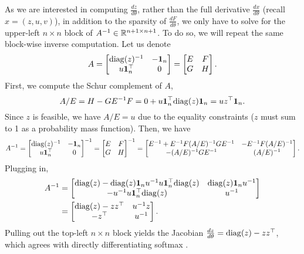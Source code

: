 \documentclass[11pt]{article}
\begin{document}
As we are interested in computing $\frac{dz}{d\theta}$,
rather than the full derivative $\frac{dx}{d\theta}$ (recall $x = (z,u,v)$),
in addition to the sparsity of $\frac{dF}{d\theta}$, 
we only have to solve for the upper-left $n\times n$ block of $A^{-1}\in\mathbb{R}^{n+1\times n+1}$.
To do so, we will repeat the same block-wise inverse computation.
Let us denote
$$A
= \begin{bmatrix} \mathrm{diag}(z)^{-1} & -\mathbf{1}_n \\ u\mathbf{1}_n^\top & 0 \end{bmatrix}
= \begin{bmatrix}E & F \\ G & H\end{bmatrix}.
$$
First, we compute the Schur complement of $A$,
\begin{equation}
A/E = H - GE^{-1}F = 0 + u\mathbf{1}_n^\top\mathrm{diag}(z)\mathbf{1}_n = uz^\top\mathbf{1}_n.
\end{equation}
Since $z$ is feasible, we have $A/E = u$ due to the equality constraints
($z$ must sum to 1 as a probability mass function).
Then, we have
\begin{equation}
A^{-1} = \begin{bmatrix}
\mathrm{diag}(z)^{-1} & -\mathbf{1}_n\\
u\mathbf{1}^\top_n & 0
\end{bmatrix}^{-1}
=\begin{bmatrix}E & F \\ G & H\end{bmatrix}^{-1}
= \begin{bmatrix}
E^{-1} + E^{-1}F(A/E)^{-1}GE^{-1} & -E^{-1}F(A/E)^{-1}\\
-(A/E)^{-1}GE^{-1} & (A/E)^{-1}
\end{bmatrix}.
\end{equation}
Plugging in,
\begin{equation}
\begin{aligned}
A^{-1} 
&= \begin{bmatrix}
\mathrm{diag}(z) - \mathrm{diag}(z)\mathbf{1}_nu^{-1}u\mathbf{1}^\top_n\mathrm{diag}(z)
    & \mathrm{diag}(z)\mathbf{1}_nu^{-1}\\
-u^{-1}u\mathbf{1}^\top_n \mathrm{diag}(z) & u^{-1}
\end{bmatrix}\\
&= \begin{bmatrix}
\mathrm{diag}(z) - zz^\top
    & u^{-1}z\\
    -z^\top & u^{-1}
\end{bmatrix}.
\end{aligned}
\end{equation}
Pulling out the top-left $n\times n$ block yields
the Jacobian $\frac{d z}{d\theta} = \mathrm{diag}(z) - zz^\top$,
which agrees with directly differentiating softmax \citep{sparsemax}.
\end{document}
